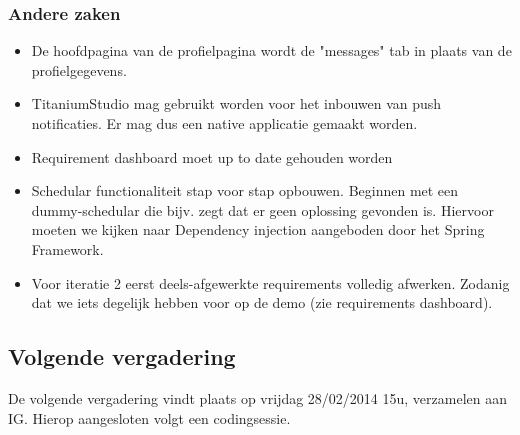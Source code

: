 \subsubsection{Andere zaken}
\begin{itemize}
	\item De hoofdpagina van de profielpagina wordt de "messages" tab in plaats van de profielgegevens.
	\item TitaniumStudio mag gebruikt worden voor het inbouwen van push notificaties. Er mag dus een native applicatie gemaakt worden.
	\item Requirement dashboard moet up to date gehouden worden 
	\item Schedular functionaliteit stap voor stap opbouwen. Beginnen met een dummy-schedular die bijv. zegt dat er geen oplossing gevonden is. Hiervoor moeten we kijken naar Dependency injection aangeboden door het Spring Framework.
	\item Voor iteratie 2 eerst deels-afgewerkte requirements volledig afwerken. Zodanig dat we iets degelijk hebben voor op de demo (zie requirements dashboard).
\end{itemize}

\subsection{Volgende vergadering}
De volgende vergadering vindt plaats op vrijdag 28/02/2014 15u, verzamelen aan IG. Hierop aangesloten volgt een codingsessie.
